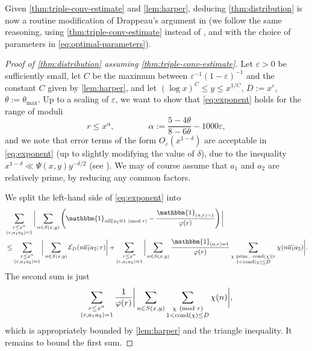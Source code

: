 \documentclass[reqno,11pt]{amsart}
\theoremstyle{definition}
\theoremstyle{remark}
\numberwithin{equation}{section}
\newcommand{\mE}{\mathcal{E}}
\newcommand{\one}{\mathbbm{1}}
\newcommand{\eps}{\varepsilon}
\renewcommand{\bar}{\overline}
\newcommand{\cond}{\textnormal{cond}}
\renewcommand{\pmod}[1]{\ (\textnormal{mod } #1)}
\begin{document}
Given \cref{thm:triple-conv-estimate} and \cref{lem:harper}, deducing \cref{thm:distribution} is now a routine modification of Drappeau's argument in \cite[\S 3.7]{drappeau2015theoremes} (we follow the same reasoning, using \cref{thm:triple-conv-estimate} instead of \cite[Th\'eor\`eme 3]{drappeau2015theoremes}, and with the choice of parameters in \cref{eq:optimal-parameters}).

\begin{proof}[Proof of \cref{thm:distribution} assuming \cref{thm:triple-conv-estimate}]
Let $\eps > 0$ be sufficiently small, let $C$ be the maximum between $\eps^{-1}(1-\eps)^{-1}$ and the constant $C$ given by \cref{lem:harper}, and let $(\log x)^C \le y \le x^{1/C}$, $D := x^\eps$, $\theta := \theta_{\max}$. Up to a scaling of $\eps$, we want to show that \cref{eq:exponent} holds for the range of moduli
\[
    r \le x^{\alpha}, \qquad\qquad {\alpha} := \frac{5-4\theta}{8-6\theta} - 1000 \eps,
\]
and we note that error terms of the form $O_\eps(x^{1-\delta})$ are acceptable in \cref{eq:exponent} (up to slightly modifying the value of $\delta$), due to the inequality $x^{1-\delta} \ll \Psi(x, y) y^{-\delta/2}$ (see \cite[p.\ 856]{drappeau2015theoremes}). We may of course assume that $a_1$ and $a_2$ are relatively prime, by reducing any common factors.

We split the left-hand side of \cref{eq:exponent} into
\[
\begin{aligned}
    &\sum_{\substack{r \le x^{\alpha} \\ (r, a_1 a_2) = 1}} 
    \bigg\vert  \sum_{n \in S(x, y)} \left(\one_{n\bar{a_1}a_2 \equiv 1 \pmod{r}} - \frac{\one_{(n,r)=1}}{\varphi(r)} \right)
    \bigg\vert 
    \\
    &\le 
    \sum_{\substack{r \le x^{\alpha} \\ (r, a_1 a_2) = 1}} 
    \bigg\vert  \sum_{n \in S(x, y)} \mE_D(n\bar{a_1}a_2; r)
    \bigg\vert  
    +
    \sum_{\substack{r \le x^{\alpha} \\ (r, a_1 a_2) = 1}} 
    \bigg\vert  \sum_{n \in S(x, y)} \frac{\one_{(n,r)=1}}{\varphi(r)} \sum_{\substack{\chi \text{ prim.},\ \cond(\chi) \mid r \\ 1 < \cond(\chi) \le D}} \chi(n\bar{a_1}a_2)
    \bigg\vert.
\end{aligned}
\]
The second sum is just
\[
    \sum_{\substack{r \le x^{\alpha} \\ (r, a_1 a_2) = 1}} \frac{1}{\varphi(r)} 
    \bigg\vert  \sum_{n \in S(x, y)} \sum_{\substack{\chi \pmod{r} \\ 1 < \cond(\chi) \le D}} \chi(n)
    \bigg\vert ,
\]
which is appropriately bounded by \cref{lem:harper} and the triangle inequality. It remains to bound the first sum. 


\end{proof}
\end{document}
